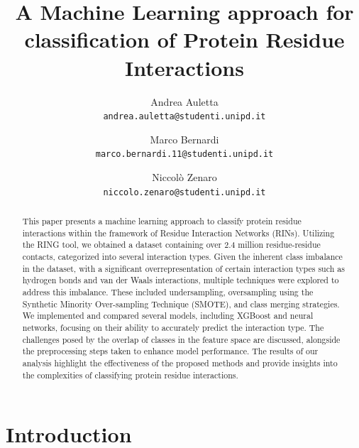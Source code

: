 \documentclass[10pt,twocolumn,letterpaper]{article}
\begin{document}
\title{A Machine Learning approach for classification of Protein Residue Interactions}

\author{Andrea Auletta\\
{\tt\small andrea.auletta@studenti.unipd.it}
\and
Marco Bernardi\\
{\tt\small marco.bernardi.11@studenti.unipd.it}
\and
Niccolò Zenaro\\
{\tt\small niccolo.zenaro@studenti.unipd.it}
}

\maketitle

\begin{abstract}
    This paper presents a machine learning approach to classify protein residue interactions within the framework of Residue Interaction Networks (RINs). 
    Utilizing the RING tool, we obtained a dataset containing over 2.4 million residue-residue contacts, categorized into several interaction types. Given the inherent class imbalance in the dataset, with a significant overrepresentation of certain interaction types such as hydrogen bonds and van der Waals interactions, multiple techniques were explored to address this imbalance. 
    These included undersampling, oversampling using the Synthetic Minority Over-sampling Technique (SMOTE), and class merging strategies. We implemented and compared several models, including XGBoost and neural networks, focusing on their ability to accurately predict the interaction type. 
    The challenges posed by the overlap of classes in the feature space are discussed, alongside the preprocessing steps taken to enhance model performance. 
    The results of our analysis highlight the effectiveness of the proposed methods and provide insights into the complexities of classifying protein residue interactions.
\end{abstract}
    

\section{Introduction}
\end{document}
